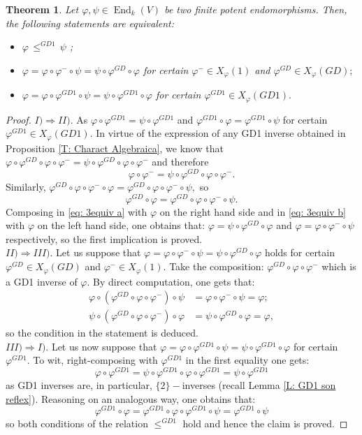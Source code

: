 \documentclass[10pt,a4paper]{amsart}
\newtheorem{thm}[defn]{Theorem}
\theoremstyle{plain}
\theoremstyle{remark}
\numberwithin{equation}{section} \numberwithin{defn}{section}
\newcommand\ed{\operatorname{End}}
\newcommand{\f}{\varphi}
\newcommand{\g}{\psi}
\begin{document}
\begin{thm}\label{T:3 equiv  }
Let $\f,\g \in \ed_k(V)$ be two finite potent endomorphisms. Then, the following statements are equivalent:
\begin{itemize}
\item[I.)] $\f \, \leq^{GD1} \, \g$  ;
\item[II.)] $\f=\f\circ \f^{-}\circ \g=\g \circ \f^{GD}\circ \f$ for certain $\f^{-}\in X_{\f}(1)$ and $\f^{GD}\in X_{\f}(GD);$  
\item[III.)] $\f=\f\circ \f^{GD1}\circ \g=\g\circ \f^{GD1}\circ \f$ for certain $\f^{GD1}\in X_{\f}(GD1).$
\end{itemize}
\end{thm}
\begin{proof}
$I) \Longrightarrow II).$ As $\f \circ \f^{GD1}=\g\circ \f^{GD1}$ and $\f^{GD1}\circ \f =\f^{GD1}\circ \g $ for certain $\f^{GD1}\in X_{\f}(GD1).$ In virtue of the expression of any GD1 inverse obtained in Proposition \ref{T: Charact Algebraica}, we know that $\f\circ \f^{GD}\circ \f \circ \f^{-}=\g\circ\f^{GD}\circ \f \circ \f^{-} $ and therefore \begin{equation}\label{eq: 3equiv a}
\f\circ \f^{-}=\g\circ \f^{GD}\circ \f \circ \f^{-}.
\end{equation}
Similarly, $\f^{GD}\circ \f \circ \f^{-}\circ \f =\f^{GD}\circ \f \circ \f^{-}\circ \g ,$ so \begin{equation}\label{eq: 3equiv b}
\f^{GD}\circ \f=\f^{GD}\circ \f \circ \f^{-}\circ \g .
\end{equation}
Composing in \eqref{eq: 3equiv a} with $\f$ on the right hand side and in \eqref{eq: 3equiv b} with $\f$ on the left hand side, one obtains that: $\f=\g\circ \f^{GD}\circ \f$ and $\f=\f\circ\f^{-}\circ \g$ respectively, so the first implication is proved. \\
$II) \Longrightarrow III).$ Let us suppose that $\f=\f\circ \f^{-}\circ \g=\g \circ \f^{GD}\circ \f$ holds for certain $\f^{GD}\in X_{\f}(GD)$ and $\f^{-}\in X_{\f}(1).$ Take the composition: $\f^{GD}\circ \f \circ \f^{-}$ which is a GD1 inverse of $\f .$ By direct computation, one gets that: \begin{align*}
\f\circ (\f^{GD}\circ \f \circ \f^{-})\circ \g & = \f \circ \f^{-}\circ \g =\f ;\\
\g\circ (\f^{GD}\circ \f \circ \f^{-})\circ \f & =\g \circ \f^{GD}\circ \f=\f ,
\end{align*}
so the condition in the statement is deduced.\\
$III)\Longrightarrow I).$ Let us now suppose that $\f=\f\circ \f^{GD1}\circ \g=\g\circ \f^{GD1}\circ \f $ for certain $\f^{GD1}.$ To wit, right-composing with $\f^{GD1}$ in the first equality one gets: $$\f\circ \f^{GD1}=\g \circ \f^{GD1}\circ \f \circ \f^{GD1}=\g \circ \f^{GD1} $$ 
as GD1 inverses are, in particular, $\{2 \}-$inverses (recall Lemma \ref{L: GD1 son reflex}). Reasoning on an analogous way, one obtains that: $$\f^{GD1}\circ \f=\f^{GD1}\circ \f \circ \f^{GD1}\circ \g =\f^{GD1}\circ \g $$ so both conditions of the relation $\leq^{GD1}$ hold and hence the claim is proved.
\end{proof}
\end{document}
